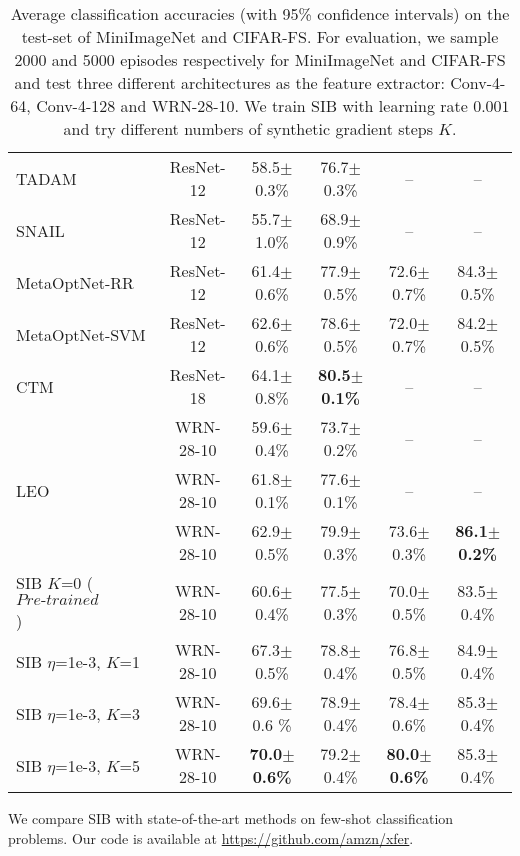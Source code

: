 \documentclass{article} \usepackage{iclr2020_conference,times}
\begin{document}
\begin{table}[t]
{\begin{tabular}{ p{4.35cm} c c c c c }
TADAM~\citep{Oreshkin2018TADAMTD} & ResNet-12 & 58.5$\pm$0.3\% & 76.7$\pm$0.3\% & -- & -- \\
SNAIL~\citep{Santoro2017ASN} & ResNet-12 & 55.7$\pm$1.0\% & 68.9$\pm$0.9\% & -- & -- \\
MetaOptNet-RR~\citep{lee2019meta} & ResNet-12 & 61.4$\pm$0.6\% & 77.9$\pm$0.5\% & 72.6$\pm$0.7\% & 84.3$\pm$0.5\% \\
MetaOptNet-SVM                     & ResNet-12 & 62.6$\pm$0.6\% & 78.6$\pm$0.5\% & 72.0$\pm$0.7\% & 84.2$\pm$0.5\% \\
CTM~\citep{li2019ctm} & ResNet-18 & 64.1$\pm$0.8\% & \textbf{80.5$\pm$0.1\%} & -- & -- \\

\citet{qiao2018few} & WRN-28-10 & 59.6$\pm$0.4\% & 73.7$\pm$0.2\% & -- & --\\
LEO~\citep{rusu2018metalearning} & WRN-28-10 & 61.8$\pm$0.1\% & 77.6$\pm$0.1\% & -- & -- \\
\citet{gidaris2019boosting} & WRN-28-10 & 62.9$\pm$0.5\% & 79.9$\pm$0.3\% & 73.6$\pm$0.3\% & \textbf{86.1$\pm$0.2\%} \\ \hline

\rowcolor[gray]{.9} SIB $K$=0 ($\textit{Pre-trained feature}$) & WRN-28-10 & 60.6$\pm$0.4\% & 77.5$\pm$0.3\% & 70.0$\pm$0.5\% & 83.5$\pm$0.4\% \\
\rowcolor[gray]{.9} SIB $\eta$=1e-3, $K$=1 & WRN-28-10 & 67.3$\pm$0.5\% & 78.8$\pm$0.4\% & 76.8$\pm$0.5\%& 84.9$\pm$0.4\%\\
\rowcolor[gray]{.9} SIB $\eta$=1e-3, $K$=3 & WRN-28-10 & 69.6$\pm$0.6 \% & 78.9$\pm$0.4\% & 78.4$\pm$0.6\% & 85.3$\pm$0.4\%\\
\rowcolor[gray]{.9} SIB $\eta$=1e-3, $K$=5 & WRN-28-10 & \textbf{70.0$\pm$0.6\%} & 79.2$\pm$0.4\% & \textbf{80.0$\pm$0.6\%}& 85.3$\pm$0.4\% \\

\bottomrule
\end{tabular}}
\caption{Average classification accuracies (with 95\% confidence intervals) on the test-set of MiniImageNet and CIFAR-FS. 
    For evaluation, we sample 2000 and 5000 episodes respectively for MiniImageNet and CIFAR-FS 
    and test three different architectures as the feature extractor: Conv-4-64, Conv-4-128 and WRN-28-10. 
    We train SIB with learning rate $0.001$ and try different numbers of synthetic gradient steps $K$.}
\label{tab:tab-1}
\end{table}


We compare SIB with state-of-the-art methods on few-shot classification problems.
Our code is available at \url{https://github.com/amzn/xfer}.
\end{document}
